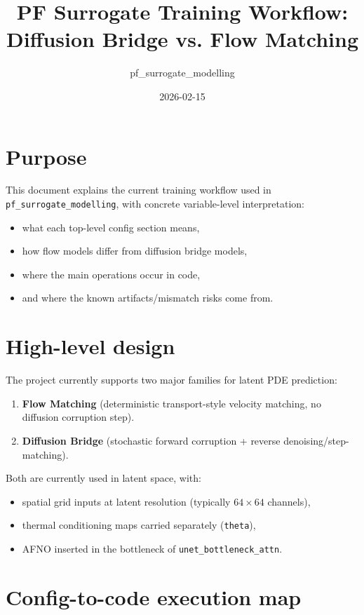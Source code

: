 \documentclass[11pt]{article}
\title{PF Surrogate Training Workflow: Diffusion Bridge vs. Flow Matching}
\author{pf\_surrogate\_modelling}
\date{2026-02-15}
\begin{document}
\maketitle

\section{Purpose}
This document explains the current training workflow used in
\texttt{pf\_surrogate\_modelling}, with concrete variable-level interpretation:
\begin{itemize}
  \item what each top-level config section means,
  \item how flow models differ from diffusion bridge models,
  \item where the main operations occur in code,
  \item and where the known artifacts/mismatch risks come from.
\end{itemize}

\section{High-level design}
The project currently supports two major families for latent PDE prediction:
\begin{enumerate}
  \item \textbf{Flow Matching} (deterministic transport-style velocity matching, no diffusion corruption step).
  \item \textbf{Diffusion Bridge} (stochastic forward corruption + reverse denoising/step-matching).
\end{enumerate}

Both are currently used in latent space, with:
\begin{itemize}
  \item spatial grid inputs at latent resolution (typically $64\times 64$ channels),
  \item thermal conditioning maps carried separately (\texttt{theta}),
  \item AFNO inserted in the bottleneck of \texttt{unet\_bottleneck\_attn}.
\end{itemize}

\section{Config-to-code execution map}
\end{document}
